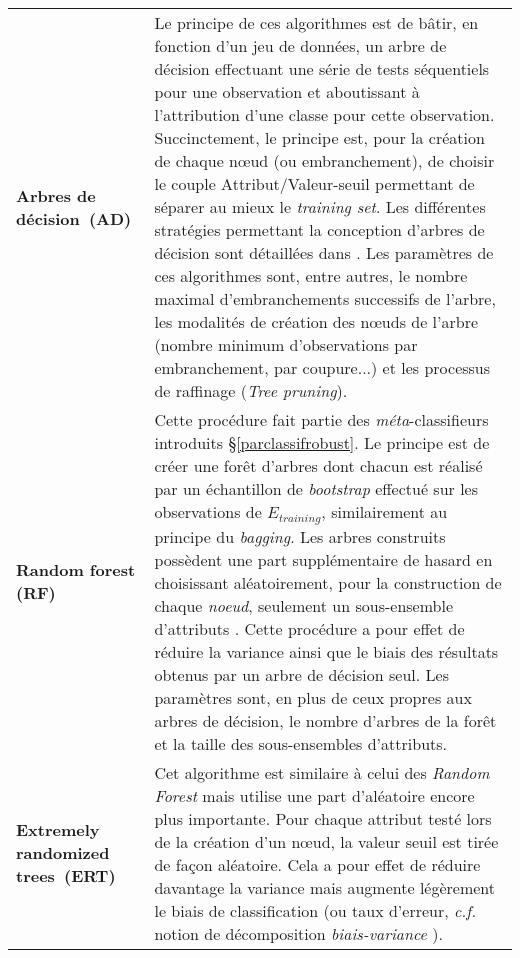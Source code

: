 \begin{longtable}{ @{\hspace{-2.2cm}} >{\bfseries}p{}|>{\small}p{\textwidth}}
	\\[0.6cm]
	Arbres de \mbox{décision (AD)} & \citep{breiman1984classification} Le principe de ces algorithmes est de bâtir, en fonction d'un jeu de données, un arbre de décision effectuant une série de tests séquentiels pour une observation et aboutissant à l'attribution d'une classe pour cette observation. Succinctement, le principe est, pour la création de chaque nœud (ou embranchement), de choisir le couple Attribut/Valeur-seuil permettant de séparer au mieux le \textit{training set}. Les différentes stratégies permettant la conception d'arbres de décision sont détaillées dans \cite[p.281]{izenman2008modern}. Les paramètres de ces algorithmes sont, entre autres, le nombre maximal d'embranchements successifs de l'arbre, les modalités de création des nœuds de l'arbre (nombre minimum d'observations par embranchement, par coupure...) et les processus de raffinage (\textit{Tree pruning}). 
	\\[0.6cm]
	Random forest (RF) & \citep{Breiman2001} Cette procédure fait partie des \textit{méta}-classifieurs introduits \S \ref{parclassifrobust}. Le principe est de créer une forêt d'arbres dont chacun est réalisé par un échantillon de \textit{bootstrap} effectué sur les observations de $E_{training}$, similairement au principe du \textit{bagging}. Les arbres construits possèdent une part supplémentaire de hasard en choisissant aléatoirement, pour la construction de chaque \textit{noeud}, seulement un sous-ensemble d'attributs \cite[p.537]{izenman2008modern}. Cette procédure a pour effet de réduire la variance ainsi que le biais des résultats obtenus par un arbre de décision seul. Les paramètres sont, en plus de ceux propres aux arbres de décision, le nombre d'arbres de la forêt et la taille des sous-ensembles d'attributs.
	\\[0.6cm]
     Extremely \mbox{randomized} \mbox{trees (ERT)} & \citep{Geurts2006a} Cet algorithme est similaire à celui des \textit{Random Forest} mais utilise une part d'aléatoire encore plus importante. Pour chaque attribut testé lors de la création d'un nœud, la valeur seuil est tirée de façon aléatoire. Cela a pour effet de réduire davantage la variance mais augmente légèrement le biais de classification (ou taux d'erreur, \textit{c.f.} notion de décomposition \textit{biais-variance} \citep[p. 354]{witten2013data}).
\end{longtable}

